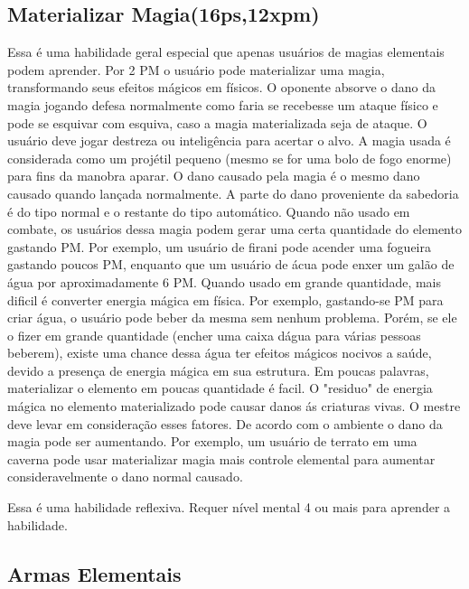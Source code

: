 \subsection{Materializar Magia(16ps,12xpm)}
 
Essa é uma habilidade geral especial que apenas usuários de magias elementais podem aprender. Por 2 PM o usuário pode materializar uma magia, transformando seus efeitos mágicos em físicos. O oponente absorve o dano da magia jogando defesa normalmente como faria se recebesse um ataque físico e pode se esquivar com esquiva, caso a magia materializada seja de ataque. O usuário deve jogar destreza ou inteligência para acertar o alvo. A magia usada é considerada como um projétil pequeno (mesmo se for uma bolo de fogo enorme) para fins da manobra aparar. O dano causado pela magia é o mesmo dano causado quando lançada normalmente. A parte do dano proveniente da sabedoria é do tipo normal e o restante do tipo automático. Quando não usado em combate, os usuários dessa magia podem gerar uma certa quantidade do elemento gastando PM. Por exemplo, um usuário de firani pode acender uma fogueira gastando poucos PM, enquanto que um usuário de ácua pode enxer um galão de água por aproximadamente 6 PM. Quando usado em grande quantidade, mais dificil é converter energia mágica em física. Por exemplo, gastando-se PM para criar água, o usuário pode beber da mesma sem nenhum problema. Porém, se ele o fizer em grande quantidade (encher uma caixa dágua para várias pessoas beberem), existe uma chance dessa água ter efeitos mágicos nocivos a saúde, devido a presença de energia mágica em sua estrutura. Em poucas palavras, materializar o elemento em poucas quantidade é facil. O "residuo" de energia mágica no elemento materializado pode causar danos ás criaturas vivas. O mestre deve levar em consideração esses fatores. De acordo com o ambiente o dano da magia pode ser aumentando. Por exemplo, um usuário de terrato em uma caverna pode usar materializar magia mais controle elemental para aumentar consideravelmente o dano normal causado.

Essa é uma habilidade reflexiva. Requer nível mental 4 ou mais para aprender a habilidade.  

\subsection {Armas Elementais}
 

